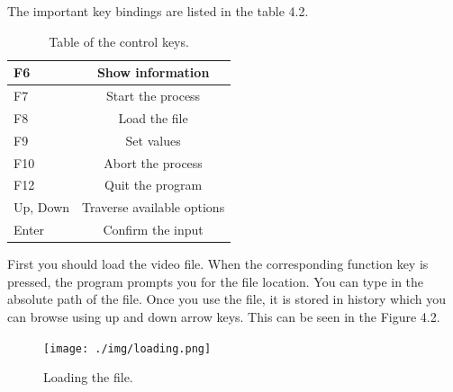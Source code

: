 The important key bindings are listed in the table 4.2.
\begin{table}[h]
\begin{center}
 \begin{tabular}{ | l | c |}
   \hline
   F6 & Show information \\ \hline
   F7 & Start the process \\ \hline
   F8 & Load the file \\ \hline
   F9 & Set values \\ \hline
   F10 & Abort the process \\ \hline
   F12 & Quit the program \\ \hline
   Up, Down & Traverse available options \\ \hline
   Enter & Confirm the input \\
 	\hline
 \end{tabular}
 \caption{Table of the control keys.}
 \end{center}
\end{table}

First you should load the video file. When the corresponding function key is pressed, the program prompts you for the file location. You can type in the absolute path of the file. Once you use the file, it is stored in history which you can browse using up and down arrow keys. This can be seen in the Figure 4.2.
\begin{figure}[h]
\begin{center}
\texttt{[image: ./img/loading.png]}
\caption{Loading the file.}
\end{center}
\end{figure}

